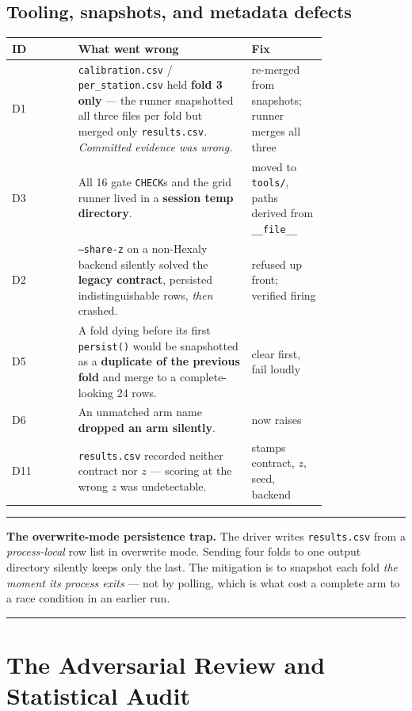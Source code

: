\documentclass[11pt,a4paper]{article}
\newenvironment{keybox}
  {\par\medskip\noindent\rule{\linewidth}{0.9pt}\par\nobreak\smallskip\ignorespaces}
  {\par\smallskip\nobreak\noindent\rule{\linewidth}{0.9pt}\par\medskip}
\begin{document}
\subsection{Tooling, snapshots, and metadata defects}

\begin{center}
\small
\begin{tabular}{lp{0.55\linewidth}p{0.24\linewidth}}
\toprule
ID & What went wrong & Fix \\
\midrule
D1 & \texttt{calibration.csv} / \texttt{per\_station.csv} held \textbf{fold 3 only} --- the runner snapshotted all three files per fold but merged only \texttt{results.csv}. \emph{Committed evidence was wrong.} & re-merged from snapshots; runner merges all three \\
D3 & All 16 gate \texttt{CHECK}s and the grid runner lived in a \textbf{session temp directory}. & moved to \texttt{tools/}, paths derived from \texttt{\_\_file\_\_} \\
D2 & \texttt{--share-z} on a non-Hexaly backend silently solved the \textbf{legacy contract}, persisted indistinguishable rows, \emph{then} crashed. & refused up front; verified firing \\
D5 & A fold dying before its first \texttt{persist()} would be snapshotted as a \textbf{duplicate of the previous fold} and merge to a complete-looking 24 rows. & clear first, fail loudly \\
D6 & An unmatched arm name \textbf{dropped an arm silently}. & now raises \\
D11 & \texttt{results.csv} recorded neither contract nor $z$ --- scoring at the wrong $z$ was undetectable. & stamps contract, $z$, seed, backend \\
\bottomrule
\end{tabular}
\end{center}

\begin{keybox}
\textbf{The overwrite-mode persistence trap.} The driver writes
\texttt{results.csv} from a \emph{process-local} row list in overwrite mode.
Sending four folds to one output directory silently keeps only the last. The
mitigation is to snapshot each fold \emph{the moment its process exits} --- not
by polling, which is what cost a complete arm to a race condition in an earlier
run.
\end{keybox}

\section{The Adversarial Review and Statistical Audit}
\end{document}
